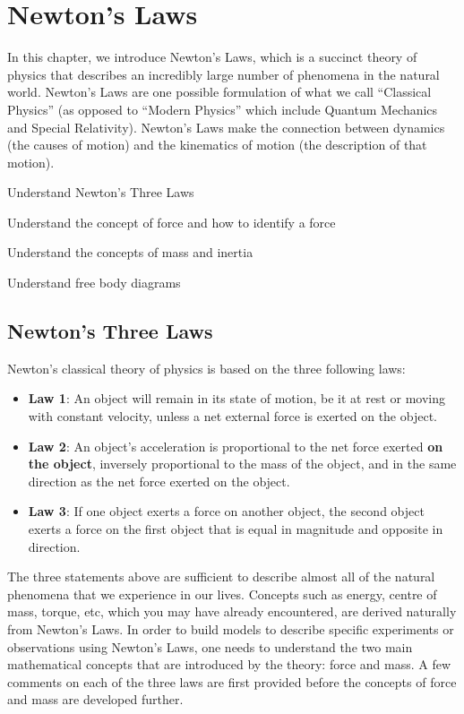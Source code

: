 
\chapter{Newton's Laws}
\label{chap:NewtonsLaws}
In this chapter, we introduce Newton's Laws, which is a succinct theory of physics that describes an incredibly large number of phenomena in the natural world. Newton's Laws are one possible formulation of what we call ``Classical Physics'' (as opposed to ``Modern Physics'' which include Quantum Mechanics and Special Relativity). Newton's Laws make the connection between dynamics (the causes of motion) and the kinematics of motion (the description of that motion). 
 \vspace{1cm}
\begin{learningObjectives}
\item Understand Newton's Three Laws
\item Understand the concept of force and how to identify a force
\item Understand the concepts of mass and inertia
\item Understand free body diagrams
\end{learningObjectives}

\section{Newton's Three Laws}
Newton's classical theory of physics is based on the three following laws:
\begin{itemize}
\item \textbf{Law 1}: An object will remain in its state of motion, be it at rest or moving with constant velocity, unless a net external force is exerted on the object.
\item \textbf{Law 2}: An object's acceleration is proportional to the net force exerted \textbf{on the object}, inversely proportional to the mass of the object, and in the same direction as the net force exerted on the object.
\item \textbf{Law 3}: If one object exerts a force on another object, the second object exerts a force on the first object that is equal in magnitude and opposite in direction.
\end{itemize}
The three statements above are sufficient to describe almost all of the natural phenomena that we experience in our lives. Concepts such as energy, centre of mass, torque, etc, which you may have already encountered, are derived naturally from Newton's Laws. In order to build models to describe specific experiments or observations using Newton's Laws, one needs to understand the two main mathematical concepts that are introduced by the theory: force and mass. A few comments on each of the three laws are first provided before the concepts of force and mass are developed further.

